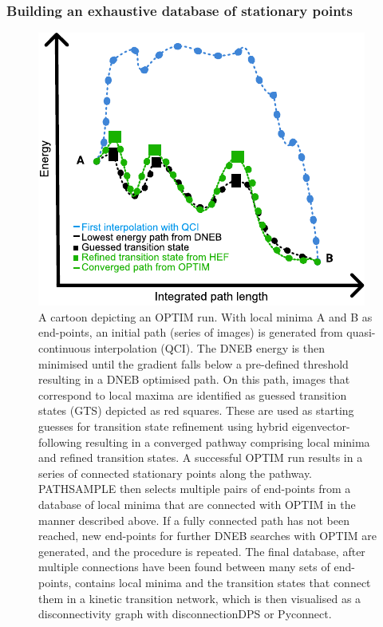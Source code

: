 \documentclass[journal=jacsat]{achemso}
\begin{document}
\subsubsection{Building an exhaustive database of stationary points}
\begin{figure}
    \centering
    \includegraphics{Fig1.pdf}
    \caption{A cartoon depicting an OPTIM run. With local minima A and B as end-points, an initial path (series of images) is generated from quasi-continuous interpolation (QCI). The DNEB energy is then minimised until the gradient falls below a pre-defined threshold resulting in a DNEB optimised path. On this path, images that correspond to local maxima are identified as guessed transition states (GTS) depicted as red squares. These are used as starting guesses for transition state refinement using hybrid eigenvector-following resulting in a converged pathway comprising local minima and refined transition states. A successful OPTIM run results in a series of connected stationary points along the pathway. PATHSAMPLE then selects multiple pairs of end-points from a database of local minima that are connected with OPTIM in the manner described above. If a fully connected path has not been reached, new end-points for further DNEB searches with OPTIM are generated, and the procedure is repeated. The final database, after multiple connections have been found between many sets of end-points, contains local minima and the transition states that connect them in a kinetic transition network, which is then visualised as a disconnectivity graph with disconnectionDPS or Pyconnect\cite{Smeeton14a}. }
    \label{fig:flow}
\end{figure}
\end{document}
